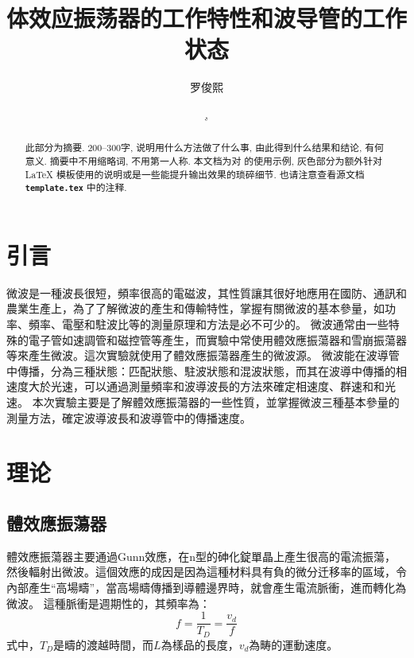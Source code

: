\documentclass[font=fandol]{mpltx}
\makeatletter
\newcommand{\note}[1]{{\color{gray}#1}}
\newcommand*\file[1]{\textbf{\texttt{#1}}}
\newcommand\releasedate{%
    \href{https://github.com/CastleStar14654/PKUMpLtX/releases/tag/\mpltx@fileversion}%
        {\mpltx@filedate, \mpltx@fileversion}}
\makeatother
\begin{document}
\title{体效应振荡器的工作特性和波导管的工作状态} %
\author{罗俊熙} %
\date{\releasedate}
\begin{abstract}
	此部分为摘要.
	200--300字, 说明用什么方法做了什么事, 由此得到什么结果和结论, 有何意义.
	摘要中不用缩略词, 不用第一人称.
	\note{本文档为对 \href{https://github.com/CastleStar14654/PKUMpLtX}{\pkg*{PKUMpLtX}} 的使用示例, 灰色部分为额外针对 \LaTeX{} 模板使用的说明或是一些能提升输出效果的琐碎细节.
		也请注意查看源文档 \file{template.tex} 中的注释.}
\end{abstract}

\maketitle

\section{引言}
微波是一種波長很短，頻率很高的電磁波，其性質讓其很好地應用在國防、通訊和農業生產上，為了了解微波的產生和傳輸特性，掌握有關微波的基本參量，如功率、頻率、電壓和駐波比等的測量原理和方法是必不可少的。
微波通常由一些特殊的電子管如速調管和磁控管等產生，而實驗中常使用體效應振蕩器和雪崩振蕩器等來產生微波。這次實驗就使用了體效應振蕩器產生的微波源。
微波能在波導管中傳播，分為三種狀態：匹配狀態、駐波狀態和混波狀態，而其在波導中傳播的相速度大於光速，可以通過測量頻率和波導波長的方法來確定相速度、群速和和光速。
本次實驗主要是了解體效應振蕩器的一些性質，並掌握微波三種基本參量的測量方法，確定波導波長和波導管中的傳播速度。

\section{理论}\label{sec:theory}
\subsection{體效應振蕩器}
體效應振蕩器主要通過Gunn效應，在n型的砷化錠單晶上產生很高的電流振蕩，然後輻射出微波。這個效應的成因是因為這種材料具有負的微分迁移率的區域，令內部產生“高場疇”，當高場疇傳播到導體邊界時，就會產生電流脈衝，進而轉化為微波。
這種脈衝是週期性的，其頻率為：
$$f=\frac{1}{T_D}=\frac{v_d}{f}$$
式中，$T_D$是疇的渡越時間，而$L$為樣品的長度，$v_d$為畴的運動速度。
\end{document}
